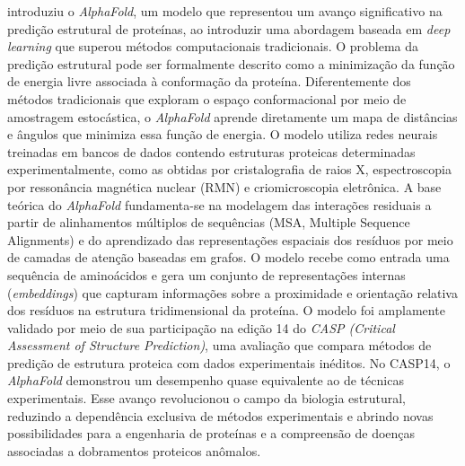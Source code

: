 \cite{Alphafold2} introduziu o \textit{AlphaFold}, um modelo que
representou um avanço significativo na predição estrutural de proteínas,
ao introduzir uma abordagem baseada em \textit{deep learning} que superou 
métodos computacionais tradicionais.
O problema da predição estrutural pode ser formalmente descrito como a minimização da função de energia livre associada 
à conformação da proteína. Diferentemente dos métodos tradicionais que exploram o espaço conformacional por meio de amostragem estocástica,
o \textit{AlphaFold} aprende diretamente um mapa de distâncias e ângulos que minimiza essa função de energia.  
O modelo utiliza redes neurais treinadas em bancos de dados contendo estruturas proteicas determinadas experimentalmente, 
como as obtidas por cristalografia de raios X, espectroscopia por ressonância magnética nuclear (RMN) e criomicroscopia eletrônica. 
A base teórica do \textit{AlphaFold} fundamenta-se na 
modelagem das interações residuais a partir de alinhamentos múltiplos de sequências (MSA, Multiple Sequence Alignments) 
e do aprendizado das representações espaciais dos resíduos por meio de camadas de atenção baseadas em grafos.
O modelo recebe como entrada uma sequência de aminoácidos e gera um conjunto de representações internas (\textit{embeddings})
que capturam informações sobre a proximidade e orientação relativa dos resíduos na estrutura tridimensional da proteína.
O modelo foi amplamente validado por meio de sua participação na 
edição 14 do \textit{CASP (Critical Assessment of Structure Prediction)}, 
uma avaliação que compara métodos de predição de estrutura proteica com dados experimentais inéditos. 
No CASP14, o \textit{AlphaFold} demonstrou um desempenho quase equivalente ao de técnicas experimentais.
Esse avanço revolucionou o campo da biologia estrutural,
reduzindo a dependência exclusiva de métodos experimentais e abrindo novas possibilidades para a engenharia de proteínas
 e a compreensão de doenças associadas a dobramentos proteicos anômalos.


